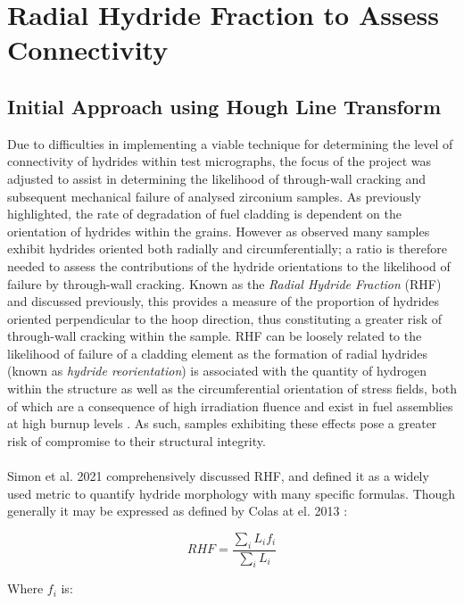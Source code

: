 \documentclass{article}
\begin{document}
\section{Radial Hydride Fraction to Assess Connectivity}
\subsection{Initial Approach using Hough Line Transform}

    Due to difficulties in implementing a viable technique for determining the level of connectivity of hydrides within test micrographs, the focus of the project was adjusted to assist in determining the likelihood of through-wall cracking and subsequent mechanical failure of analysed zirconium samples. As previously highlighted, the rate of degradation of fuel cladding is dependent on the orientation of hydrides within the grains. However as observed many samples exhibit hydrides oriented both radially and circumferentially; a ratio is therefore needed to assess the contributions of the hydride orientations to the likelihood of failure by through-wall cracking. Known as the \textit{Radial Hydride Fraction} (RHF) and discussed previously, this provides a measure of the proportion of hydrides oriented perpendicular to the hoop direction, thus constituting a greater risk of through-wall cracking within the sample. RHF can be loosely related to the likelihood of failure of a cladding element as the formation of radial hydrides (known as \textit{hydride reorientation}) is associated with the quantity of hydrogen within the structure as well as the circumferential orientation of stress fields, both of which are a consequence of high irradiation fluence and exist in fuel assemblies at high burnup levels \cite{Plyasov2020}. As such, samples exhibiting these effects pose a greater risk of compromise to their structural integrity.
    \\
    \\
    Simon et al. 2021 \cite{Simon2021} comprehensively discussed RHF, and defined it as a widely used metric to quantify hydride morphology with many specific formulas. Though generally it may be expressed as defined by Colas at el. 2013 \cite{Colas2013}:
    
    \begin{equation}
        RHF = \frac{ \sum_i{L_i f_i} }{ \sum_i{L_i} }
    \end{equation}
    \label{equ:RHF}
    
    Where $f_i$ is:
    
\end{document}

